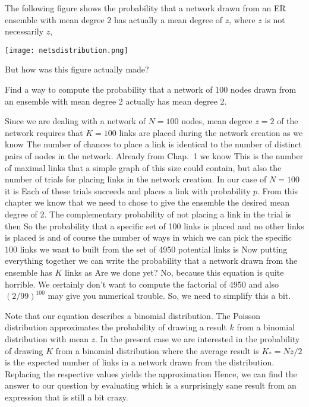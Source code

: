 
The following figure shows the probability that a network drawn from an ER ensemble with mean degree $2$ has actually a mean degree of $z$, where $z$ is not necessarily $z$,
\begin{center}
\texttt{[image: netsdistribution.png]}
\end{center}
But how was this figure actually made? 

\subquestion Find a way to compute the probability that a network of 100 nodes drawn from an ensemble with mean degree 2 actually has mean degree 2. 

\solution
Since we are dealing with a network of $N=100$ nodes, mean degree $z=2$ of the network requires that $K=100$ links are placed during the network creation as we know 
The number of chances to place a link is identical to the number of distinct pairs of nodes in the network. Already from Chap.~1 we know 
This is the number of maximal links that a simple graph of this size could contain, but also the number of trials for placing links in the network creation. In our case of $N=100$ it is
Each of these trials succeeds and places a link with probability $p$. From this chapter we know that we need to chose 
to give the ensemble the desired mean degree of 2. The complementary probability of not placing a link in the trial is then 
So the probability that a specific set of 100 links is placed and no other links is placed is 
and of course the number of ways in which we can pick the specific 100 links we want to built from the set of 4950 potential links is 
Now putting everything together we can write the probability that a network drawn from the ensemble has $K$ links as 
Are we done yet? No, because this equation is quite horrible. We certainly don't want to compute the factorial of 4950 and also $(2/99)^{100}$ may give you numerical trouble. So,  we need to simplify this a bit. 

Note that our equation describes a binomial distribution. 
The Poisson distribution 
approximates the probability of drawing a result $k$ from a binomial distribution with mean $z$. In the present case we are interested in the probability of drawing $K$ from a binomial distribution where the average result is $K_*=Nz/2$ is the expected number of links in a network drawn from the distribution. Replacing the respective values yields the approximation 
Hence, we can find the answer to our question by evaluating 
which is a surprisingly sane result from an expression that is still a bit crazy. 

